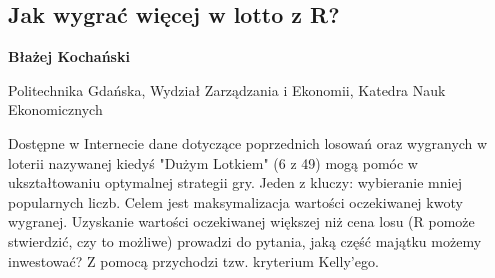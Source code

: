 \documentclass[\main/boa.tex]{subfiles}
\begin{document}
\subsection{Jak wygrać więcej w lotto z R?}

\begin{minipage}{0.915\textwidth}
	\centering
  {\bf {} Błażej Kochański}
\end{minipage}


\begin{affiliations}
\begin{minipage}{0.915\textwidth}
\centering
Politechnika Gdańska, Wydział Zarządzania i Ekonomii, Katedra Nauk Ekonomicznych  \\[-2pt]
\end{minipage}
\end{affiliations}

\vskip 0.3cm

 Dostępne w Internecie dane dotyczące poprzednich losowań oraz wygranych w loterii nazywanej kiedyś "Dużym Lotkiem" (6 z 49) mogą pomóc w ukształtowaniu optymalnej strategii gry. Jeden z kluczy: wybieranie mniej popularnych liczb. Celem jest maksymalizacja wartości oczekiwanej kwoty wygranej. Uzyskanie wartości oczekiwanej większej niż cena losu (R pomoże stwierdzić, czy to możliwe) prowadzi do pytania, jaką część majątku możemy inwestować? Z pomocą przychodzi tzw. kryterium Kelly'ego. 
\end{document}
